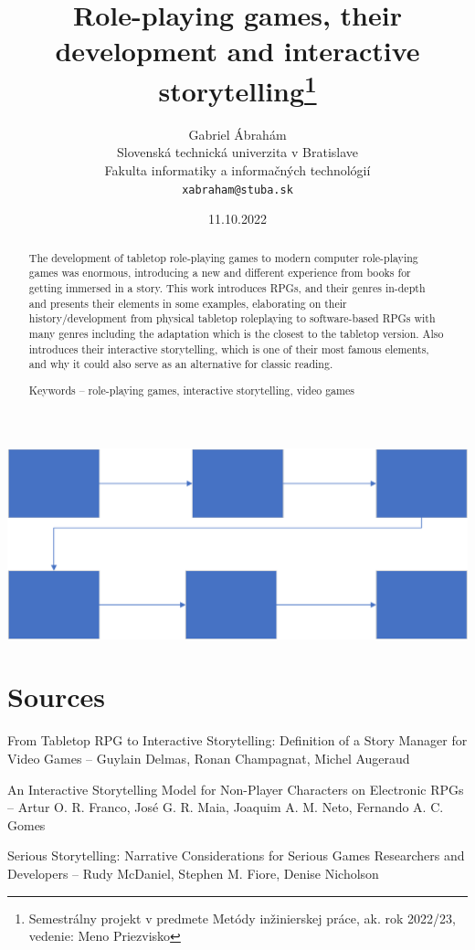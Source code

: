 \documentclass[10pt,twoside,english,a4paper]{article}
\title{Role-playing games, their development and interactive storytelling\thanks{Semestrálny projekt v predmete Metódy inžinierskej práce, ak. rok 2022/23, vedenie: Meno Priezvisko}} %
\author{Gabriel Ábrahám\\[2pt]
	{\small Slovenská technická univerzita v Bratislave}\\
	{\small Fakulta informatiky a informačných technológií}\\
	{\small \texttt{xabraham@stuba.sk}}
	}
\date{\small 11.10.2022}
\begin{document}
\maketitle

\begin{abstract}
The development of tabletop role-playing games to modern 
computer role-playing games was enormous, introducing a new and 
different experience from books for getting immersed in a story. This 
work introduces RPGs, and their genres in-depth and presents their 
elements in some examples, elaborating on their 
history/development from physical tabletop roleplaying to software-based RPGs with many genres including the adaptation which is the 
closest to the tabletop version. Also introduces their interactive 
storytelling, which is one of their most famous elements, and why it 
could also serve as an alternative for classic reading.

Keywords – role-playing games, interactive storytelling, video games
\end{abstract}


\includegraphics[scale=0.3]{diagram.pdf}

\section{Sources}


From Tabletop RPG to Interactive Storytelling: Definition of a Story 
Manager for Video Games – Guylain Delmas, Ronan Champagnat, Michel 
Augeraud

An Interactive Storytelling Model for Non-Player Characters on Electronic 
RPGs – Artur O. R. Franco, José G. R. Maia, Joaquim A. M. Neto, Fernando 
A. C. Gomes

Serious Storytelling: Narrative Considerations for Serious Games 
Researchers and Developers – Rudy McDaniel, Stephen M. Fiore, Denise 
Nicholson
\end{document}
